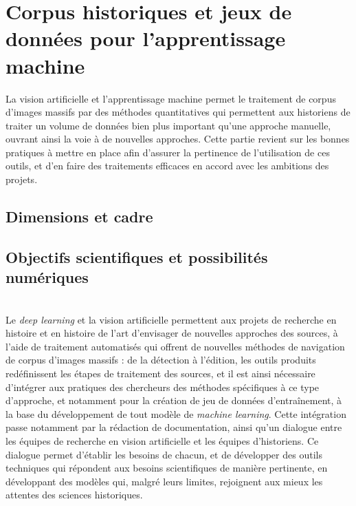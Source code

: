 \documentclass[a4paper,12pt,twoside]{book}
\newcommand{\ml}{\textit{machine learning}\xspace}
\newcommand{\dl}{\textit{deep learning}\xspace}
\newcommand{\clearemptydoublepage}{\newpage{\pagestyle{empty}\cleardoublepage}}
\begin{document}
        \chapter[Corpus historiques et jeux de données]{Corpus historiques et jeux de données pour l’apprentissage machine}
        
        La vision artificielle et l'apprentissage machine permet le traitement de corpus d'images massifs par des méthodes quantitatives qui permettent aux historiens de traiter un volume de données bien plus important qu'une approche manuelle, ouvrant ainsi la voie à de nouvelles approches. Cette partie revient sur les bonnes pratiques à mettre en place afin d'assurer la pertinence de l'utilisation de ces outils, et d'en faire des traitements efficaces en accord avec les ambitions des projets.
        
                \section{Dimensions et cadre}
                    
            
                \section{Objectifs scientifiques et possibilités numériques}
                    
        \\
        
        Le \dl et la vision artificielle permettent aux projets de recherche en histoire et en histoire de l'art d'envisager de nouvelles approches des sources, à l'aide de traitement automatisés qui offrent de nouvelles méthodes de navigation de corpus d'images massifs : de la détection à l'édition, les outils produits redéfinissent les étapes de traitement des sources, et il est ainsi nécessaire d'intégrer aux pratiques des chercheurs des méthodes spécifiques à ce type d'approche, et notamment pour la création de jeu de données d'entraînement, à la base du développement de tout modèle de \ml. Cette intégration passe notamment par la rédaction de documentation, ainsi qu'un dialogue entre les équipes de recherche en vision artificielle et les équipes d'historiens. Ce dialogue permet d'établir les besoins de chacun, et de développer des outils techniques qui répondent aux besoins scientifiques de manière pertinente, en développant des modèles qui, malgré leurs limites, rejoignent aux mieux les attentes des sciences historiques.
        \clearemptydoublepage
\end{document}
